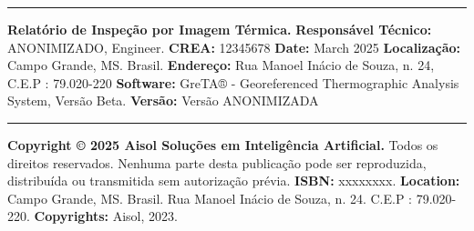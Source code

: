 \documentclass[dvipsnames]{article}%
\begin{document}
%
\newpage%
\thispagestyle{empty}%
\vspace*{0.4cm}%
\rule{\linewidth}{0.5pt}%
\begin{center}%
{\large\bfseries Relatório de Inspeção por Imagem Térmica.  }%
\vspace*{0.5cm}%
\textbf{Responsável Técnico:} ANONIMIZADO, Engineer.  %
\textbf{CREA:} 12345678  %
\textbf{Date:} March 2025%
\textbf{Localização:} Campo Grande, MS. Brasil.  %
\textbf{Endereço:} Rua Manoel Inácio de Souza, n. 24, C.E.P : 79.020-220  %
\textbf{Software:} GreTA® - Georeferenced Thermographic Analysis System, Versão Beta.  %
\textbf{Versão:} Versão ANONIMIZADA  %
\end{center}%
\vspace*{0.4cm}%
\rule{\linewidth}{0.5pt}%
\vfill%
\noindent\textbf{Copyright © 2025 Aisol Soluções em Inteligência Artificial.  }%
Todos os direitos reservados. Nenhuma parte desta publicação pode ser reproduzida, distribuída ou transmitida sem autorização prévia.  %
\vspace*{0.2cm}%
\noindent\textbf{ISBN:} xxxxxxxx.  %
\textbf{Location:}%
Campo Grande, MS. Brasil.  %
Rua Manoel Inácio de Souza, n. 24.  %
C.E.P : 79.020{-}220.  %
\textbf{Copyrights:}%
Aisol, 2023.  %
\end{document}
